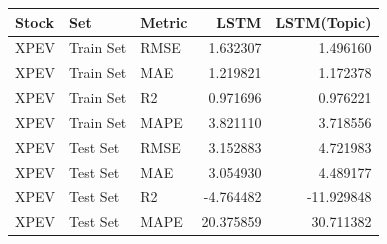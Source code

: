 \begin{tabular}{lllrr}
\toprule
Stock & Set & Metric & LSTM & LSTM(Topic) \\
\midrule
XPEV & Train Set & RMSE & 1.632307 & 1.496160 \\
XPEV & Train Set & MAE & 1.219821 & 1.172378 \\
XPEV & Train Set & R2 & 0.971696 & 0.976221 \\
XPEV & Train Set & MAPE & 3.821110 & 3.718556 \\
XPEV & Test Set & RMSE & 3.152883 & 4.721983 \\
XPEV & Test Set & MAE & 3.054930 & 4.489177 \\
XPEV & Test Set & R2 & -4.764482 & -11.929848 \\
XPEV & Test Set & MAPE & 20.375859 & 30.711382 \\
\bottomrule
\end{tabular}

